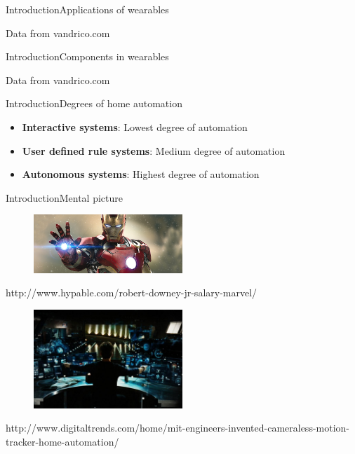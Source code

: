 \begin{frame}{Introduction}{Applications of wearables}
\centering
\begin{figure}
  \scalebox{0.8}{}
\end{figure}
{\tiny Data from vandrico.com}
\end{frame}

\begin{frame}{Introduction}{Components in wearables}
\centering
\begin{figure}
  \scalebox{0.8}{}
\end{figure}
{\tiny Data from vandrico.com}
\end{frame}

\begin{frame}{Introduction}{Degrees of home automation}
\begin{itemize}
\item \textbf{Interactive systems}: Lowest degree of automation
\item \textbf{User defined rule systems}: Medium degree of automation
\item \textbf{Autonomous systems}: Highest degree of automation
\end{itemize}
\end{frame}

\begin{frame}{Introduction}{Mental picture}
\centering
\vspace{-0.3cm}
\begin{figure}
  \includegraphics[width=0.5\textwidth]{images/iron-man-1}
\end{figure}
\vspace{-0.5cm}
{\tiny http://www.hypable.com/robert-downey-jr-salary-marvel/}
\vspace{-0.1cm}
\begin{figure}
  \includegraphics[width=0.5\textwidth]{images/iron-man-2}
\end{figure}
\vspace{-0.5cm}
{\tiny http://www.digitaltrends.com/home/mit-engineers-invented-cameraless-motion-tracker-home-automation/}
\end{frame}

